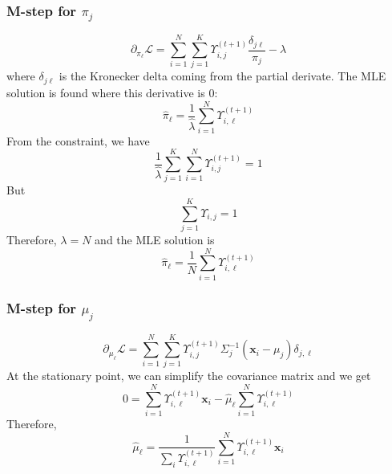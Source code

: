 \documentclass{article}
\numberwithin{equation}{section}
\theoremstyle{named}
\begin{document}
\subsubsection{M-step for $\pi_j$}
\[
        \partial_{\pi_\ell} \mathcal{L} = \sum_{i=1}^{N} \sum_{j = 1}^{K} 
        \Upsilon_{i, j}^{(t + 1)} \frac{\delta_{j \ell}}{\pi_j} 
        - 
        \lambda
\]
where $\delta_{j\ell}$ is the Kronecker delta coming from the partial derivate.
The MLE solution is found where this derivative is 0:
\[
        \hat{\pi}_\ell = \frac{1}{\hat{\lambda}}\sum_{i = 1}^{N}
        \Upsilon_{i,\ell}^{(t + 1)} 
\]
From the constraint, we have
\[
        \frac{1}{\hat{\lambda}}\sum_{j = 1}^{K}\sum_{i = 1}^{N} 
        \Upsilon_{i, j}^{(t+1)} = 1
\]
But
\[
        \sum_{j = 1}^{K}\Upsilon_{i, j} = 1
\]
Therefore, $\lambda = N$ and the MLE solution is 
\[
        \boxed{\hat{\pi}_\ell = \frac{1}{N}\sum_{i = 1}^{N} \Upsilon_{i, \ell}^{(t+1)}}
\]


\subsubsection{M-step for $\mu_j$}
\[
        \partial_{\mu_\ell} \mathcal{L} = \sum_{i = 1}^{N} \sum_{j = 1}^{K} 
        \Upsilon_{i, j}^{(t+1)}\Sigma^{-1}_j(\mathbf{x}_i - \mu_j) \delta_{j, \ell}
\]
At the stationary point, we can simplify the covariance matrix and we get 
\[
        0 = \sum_{i = 1}^{N} \Upsilon_{i, \ell}^{(t+1)}\mathbf{x}_i 
        - \hat{\mu}_\ell\sum_{i = 1}^{N}\Upsilon_{i, \ell}^{(t+1)}
\]
Therefore, 
\[
      \boxed{  \hat{\mu}_{\ell} = \frac{1}{\displaystyle \sum_i \Upsilon_{i, \ell} 
      ^{(t+1)}} \sum_{i = 1}^{N} \Upsilon_{i, \ell}^{(t + 1)} \mathbf{x}_i}
\]
\end{document}
